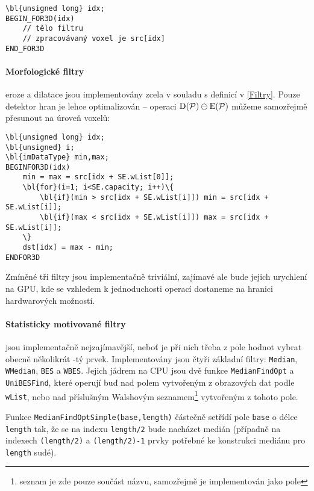         \begin{Verbatim}[commandchars = \\\{\}]
\bl{unsigned long} idx;
BEGIN_FOR3D(idx)
    // tělo filtru
    // zpracovávaný voxel je src[idx]
END_FOR3D
        \end{Verbatim}

        \paragraph{Morfologické filtry} eroze a dilatace jsou implementovány zcela v souladu s definicí v \ref{Filtry}. Pouze detektor hran je lehce optimalizován -- operaci $\mathrm{D}(\mathcal{P}) \ominus \mathrm{E}(\mathcal{P})$ můžeme samozřejmě přesunout na úroveň voxelů:

        \begin{Verbatim}[commandchars = \\\{\}]
\bl{unsigned long} idx;
\bl{unsigned} i;
\bl{imDataType} min,max;
BEGINFOR3D(idx)
    min = max = src[idx + SE.wList[0]];
    \bl{for}(i=1; i<SE.capacity; i++)\{
        \bl{if}(min > src[idx + SE.wList[i]]) min = src[idx + SE.wList[i]];
        \bl{if}(max < src[idx + SE.wList[i]]) max = src[idx + SE.wList[i]];
    \}
    dst[idx] = max - min;
ENDFOR3D
        \end{Verbatim}

        Zmíněné tři filtry jsou implementačně triviální, zajímavé ale bude jejich urychlení na GPU, kde se vzhledem k jednoduchosti operací dostaneme na hranici hardwarových možností.

        \paragraph{Statisticky motivované filtry} jsou implementačně nejzajímavější, neboť je při nich třeba z pole hodnot vybrat obecně několikrát \kk-tý prvek. Implementovány jsou čtyři základní filtry: {\tt Median}, {\tt WMedian}, {\tt BES} a {\tt WBES}. Jejich jádrem na CPU jsou dvě funkce {\tt MedianFindOpt} a {\tt UniBESFind}, které operují buď nad polem vytvořeným z obrazových dat podle {\tt wList}, nebo nad příslušným Walshovým seznamem\footnote{seznam je zde pouze součást názvu, samozřejmě je implementován jako pole} vytvořeným z tohoto pole.

        Funkce {\tt MedianFindOptSimple(base,length)} částečně setřídí pole {\tt base} o délce {\tt length} tak, že se na indexu {\tt length/2} bude nacházet medián (případně na indexech {\tt (length/2)} a {\tt (length/2)-1} prvky potřebné ke konstrukci mediánu pro {\tt length} sudé).

